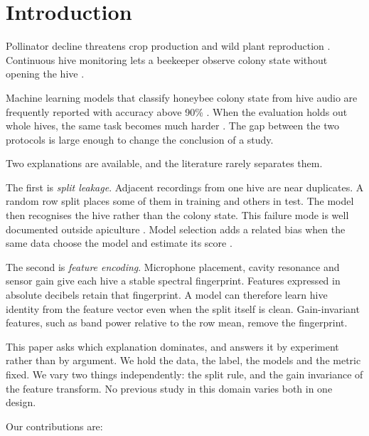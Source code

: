 ﻿\documentclass[review,12pt]{elsarticle}
\begin{document}
\section{Introduction}

Pollinator decline threatens crop production and wild plant reproduction
\cite{potts2010,gallai2009}.
Continuous hive monitoring lets a beekeeper observe colony state without
opening the hive \cite{meikle2015}.

Machine learning models that classify honeybee colony state from hive audio
are frequently reported with accuracy above 90\%
\cite{nolasco2018tobee,zgank2021,harshit2025beehivesound,sucipto2025survey}.
When the evaluation holds out whole hives, the same task becomes much harder
\cite{bricout2024beetogether}.
The gap between the two protocols is large enough to change the conclusion of
a study.

Two explanations are available, and the literature rarely separates them.

The first is \emph{split leakage}.
Adjacent recordings from one hive are near duplicates.
A random row split places some of them in training and others in test.
The model then recognises the hive rather than the colony state.
This failure mode is well documented outside apiculture
\cite{kaufman2012leakage,kapoor2023leakage,roberts2017cv}.
Model selection adds a related bias when the same data choose the model and
estimate its score \cite{varma2006bias,cawley2010overfitting}.

The second is \emph{feature encoding}.
Microphone placement, cavity resonance and sensor gain give each hive a stable
spectral fingerprint.
Features expressed in absolute decibels retain that fingerprint.
A model can therefore learn hive identity from the feature vector even when the
split itself is clean.
Gain-invariant features, such as band power relative to the row mean, remove
the fingerprint.

This paper asks which explanation dominates, and answers it by experiment
rather than by argument.
We hold the data, the label, the models and the metric fixed.
We vary two things independently: the split rule, and the gain invariance of
the feature transform.
No previous study in this domain varies both in one design.

Our contributions are:
\end{document}
